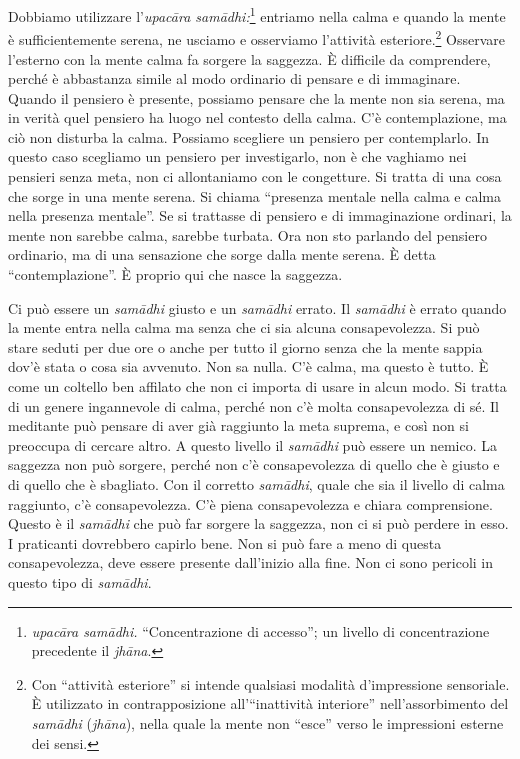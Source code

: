 Dobbiamo utilizzare l'\emph{upacāra samādhi:}\footnote{\emph{upacāra samādhi.}
  ``Concentrazione di accesso''; un livello di concentrazione precedente
  il \emph{jhāna}.} entriamo nella calma e quando la mente è
sufficientemente serena, ne usciamo e osserviamo l'attività
esteriore.\footnote{Con ``attività esteriore'' si intende qualsiasi
  modalità d'impressione sensoriale. È utilizzato in contrapposizione
  all'``inattività interiore'' nell'assorbimento del \emph{samādhi}
  (\emph{jhāna}), nella quale la mente non ``esce'' verso le impressioni
  esterne dei sensi.} Osservare l'esterno con la mente calma fa sorgere
la saggezza. È difficile da comprendere, perché è abbastanza simile al
modo ordinario di pensare e di immaginare. Quando il pensiero è
presente, possiamo pensare che la mente non sia serena, ma in verità
quel pensiero ha luogo nel contesto della calma. C'è contemplazione, ma
ciò non disturba la calma. Possiamo scegliere un pensiero per
contemplarlo. In questo caso scegliamo un pensiero per investigarlo, non
è che vaghiamo nei pensieri senza meta, non ci allontaniamo con le
congetture. Si tratta di una cosa che sorge in una mente serena. Si
chiama ``presenza mentale nella calma e calma nella presenza mentale''.
Se si trattasse di pensiero e di immaginazione ordinari, la mente non
sarebbe calma, sarebbe turbata. Ora non sto parlando del pensiero
ordinario, ma di una sensazione che sorge dalla mente serena. È detta
``contemplazione''. È proprio qui che nasce la saggezza.

Ci può essere un \emph{samādhi} giusto e un \emph{samādhi} errato. Il
\emph{samādhi} è errato quando la mente entra nella calma ma senza che
ci sia alcuna consapevolezza. Si può stare seduti per due ore o anche
per tutto il giorno senza che la mente sappia dov'è stata o cosa sia
avvenuto. Non sa nulla. C'è calma, ma questo è tutto. È come un coltello
ben affilato che non ci importa di usare in alcun modo. Si tratta di un
genere ingannevole di calma, perché non c'è molta consapevolezza di sé.
Il meditante può pensare di aver già raggiunto la meta suprema, e così
non si preoccupa di cercare altro. A questo livello il \emph{samādhi}
può essere un nemico. La saggezza non può sorgere, perché non c'è
consapevolezza di quello che è giusto e di quello che è sbagliato. Con
il corretto \emph{samādhi}, quale che sia il livello di calma raggiunto,
c'è consapevolezza. C'è piena consapevolezza e chiara comprensione.
Questo è il \emph{samādhi} che può far sorgere la saggezza, non ci si
può perdere in esso. I praticanti dovrebbero capirlo bene. Non si può
fare a meno di questa consapevolezza, deve essere presente dall'inizio
alla fine. Non ci sono pericoli in questo tipo di \emph{samādhi}.

